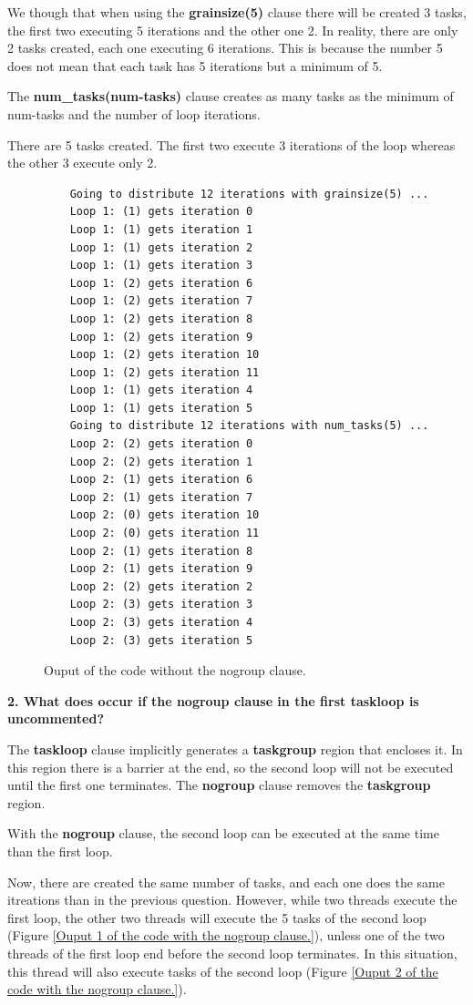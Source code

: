 \documentclass[12pt, a4paper]{article}
\begin{document}
We though that when using the \textbf{grainsize(5)} clause there will be created 3 tasks, the first two executing 5 iterations and the other one 2. In reality, there are only 2 tasks created, each one executing 6 iterations. This is because the number 5 does not mean that each task has 5 iterations but a minimum of 5.

The \textbf{num\_tasks(num-tasks)} clause creates as many tasks as the minimum of num-tasks and the number of loop iterations.

There are 5 tasks created. The first two execute 3 iterations of the loop whereas the other 3 execute only 2.

\begin{figure}[H]
	\begin{lstlisting}
	Going to distribute 12 iterations with grainsize(5) ...
	Loop 1: (1) gets iteration 0
	Loop 1: (1) gets iteration 1
	Loop 1: (1) gets iteration 2
	Loop 1: (1) gets iteration 3
	Loop 1: (2) gets iteration 6
	Loop 1: (2) gets iteration 7
	Loop 1: (2) gets iteration 8
	Loop 1: (2) gets iteration 9
	Loop 1: (2) gets iteration 10
	Loop 1: (2) gets iteration 11
	Loop 1: (1) gets iteration 4
	Loop 1: (1) gets iteration 5
	Going to distribute 12 iterations with num_tasks(5) ...
	Loop 2: (2) gets iteration 0
	Loop 2: (2) gets iteration 1
	Loop 2: (1) gets iteration 6
	Loop 2: (1) gets iteration 7
	Loop 2: (0) gets iteration 10
	Loop 2: (0) gets iteration 11
	Loop 2: (1) gets iteration 8
	Loop 2: (1) gets iteration 9
	Loop 2: (2) gets iteration 2
	Loop 2: (3) gets iteration 3
	Loop 2: (3) gets iteration 4
	Loop 2: (3) gets iteration 5
	\end{lstlisting}
	
	\caption{Ouput of the code without the nogroup clause.}
\end{figure}

\hfill

\textbf{2. What does occur if the nogroup clause in the first taskloop is uncommented?}

The \textbf{taskloop} clause implicitly generates a \textbf{taskgroup} region that encloses it. In this region there is a barrier at the end, so the second loop will not be executed until the first one terminates. The \textbf{nogroup} clause removes the \textbf{taskgroup} region.

With the \textbf{nogroup} clause, the second loop can be executed at the same time than the first loop.

Now, there are created the same number of tasks, and each one does the same itreations than in the previous question. However, while two threads execute the first loop, the other two threads will execute the 5 tasks of the second loop (Figure \ref{Ouput 1 of the code with the nogroup clause.}), unless one of the two threads of the first loop end before the second loop terminates. In this situation, this thread will also execute tasks of the second loop (Figure \ref{Ouput 2 of the code with the nogroup clause.}).
\end{document}
